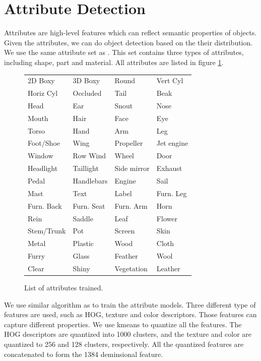 \documentclass[10pt,twocolumn,letterpaper]{article}
\begin{document}
\section{Attribute Detection}
\label{sec:attribute}

Attributes are high-level features which can reflect semantic properties of objects. Given the attributes, we can do object detection based on the their distribution. We use the same attribute set as \cite{farhadi09}. This set contains three types of attributes, including shape, part and material. All attributes are listed in figure \ref{fig:atts}.

\begin{figure}
\begin{tabular}{llll}
2D Boxy & 3D Boxy & Round & Vert Cyl \\
Horiz Cyl & Occluded & Tail & Beak \\
Head & Ear & Snout & Nose \\
Mouth & Hair & Face & Eye \\
Torso & Hand & Arm & Leg \\
Foot/Shoe & Wing & Propeller & Jet engine \\
Window & Row Wind & Wheel & Door \\
Headlight & Taillight & Side mirror & Exhaust \\
Pedal & Handlebars & Engine & Sail \\
Mast & Text & Label & Furn. Leg \\
Furn. Back & Furn. Seat & Furn. Arm & Horn \\
Rein & Saddle & Leaf & Flower \\
Stem/Trunk & Pot & Screen & Skin \\
Metal & Plastic & Wood & Cloth \\
Furry & Glass & Feather & Wool \\
Clear & Shiny & Vegetation & Leather \\
\end{tabular}
\caption{List of attributes trained.}
\label{fig:atts}
\end{figure}

We use similar algorithm as \cite{farhadi09} to train the attribute models. Three different type of features are used, such as HOG, texture and color descriptors\cite{farhadi09}. Those features can capture different properties. We use kmeans to quantize all the features. The HOG descriptors are quantized into 1000 clusters, and the texture and color are quantized to 256 and 128 clusters, respectively. All the quantized features are concatenated to form the 1384 deminsional feature. 
\end{document}
